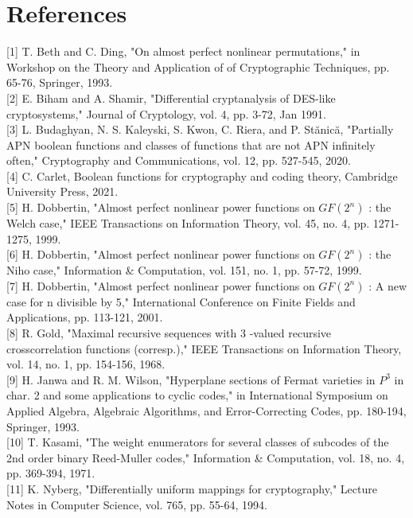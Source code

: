 \documentclass[10pt]{article}
\begin{document}
\section*{References}
[1] T. Beth and C. Ding, "On almost perfect nonlinear permutations," in Workshop on the Theory and Application of of Cryptographic Techniques, pp. 65-76, Springer, 1993.\\[0pt]
[2] E. Biham and A. Shamir, "Differential cryptanalysis of DES-like cryptosystems," Journal of Cryptology, vol. 4, pp. 3-72, Jan 1991.\\[0pt]
[3] L. Budaghyan, N. S. Kaleyski, S. Kwon, C. Riera, and P. Stănică, "Partially APN boolean functions and classes of functions that are not APN infinitely often," Cryptography and Communications, vol. 12, pp. 527-545, 2020.\\[0pt]
[4] C. Carlet, Boolean functions for cryptography and coding theory, Cambridge University Press, 2021.\\[0pt]
[5] H. Dobbertin, "Almost perfect nonlinear power functions on $G F\left(2^{n}\right)$ : the Welch case," IEEE Transactions on Information Theory, vol. 45, no. 4, pp. 1271-1275, 1999.\\[0pt]
[6] H. Dobbertin, "Almost perfect nonlinear power functions on $G F\left(2^{n}\right)$ : the Niho case," Information \& Computation, vol. 151, no. 1, pp. 57-72, 1999.\\[0pt]
[7] H. Dobbertin, "Almost perfect nonlinear power functions on $G F\left(2^{n}\right)$ : A new case for n divisible by 5," International Conference on Finite Fields and Applications, pp. 113-121, 2001.\\[0pt]
[8] R. Gold, "Maximal recursive sequences with 3 -valued recursive crosscorrelation functions (corresp.)," IEEE Transactions on Information Theory, vol. 14, no. 1, pp. 154-156, 1968.\\[0pt]
[9] H. Janwa and R. M. Wilson, "Hyperplane sections of Fermat varieties in $P^{3}$ in char. 2 and some applications to cyclic codes," in International Symposium on Applied Algebra, Algebraic Algorithms, and Error-Correcting Codes, pp. 180-194, Springer, 1993.\\[0pt]
[10] T. Kasami, "The weight enumerators for several classes of subcodes of the 2nd order binary Reed-Muller codes," Information \& Computation, vol. 18, no. 4, pp. 369-394, 1971.\\[0pt]
[11] K. Nyberg, "Differentially uniform mappings for cryptography," Lecture Notes in Computer Science, vol. 765, pp. 55-64, 1994.
\end{document}
